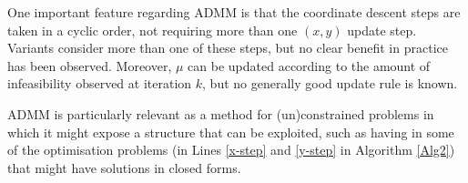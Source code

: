 One important feature regarding ADMM is that the coordinate descent steps are taken in a cyclic order, not requiring more than one $(x,y)$ update step. Variants consider more than one of these steps, but no clear benefit in practice has been observed. Moreover, $\mu$ can be updated according to the amount of infeasibility observed at iteration $k$, but no generally good update rule is known. 

ADMM is particularly relevant as a method for (un)constrained problems in which it might expose a structure that can be exploited, such as having in some of the optimisation problems (in Lines \ref{x-step} and \ref{y-step} in Algorithm \ref{Alg2}) that might have solutions in closed forms.  



%
%
%
%

